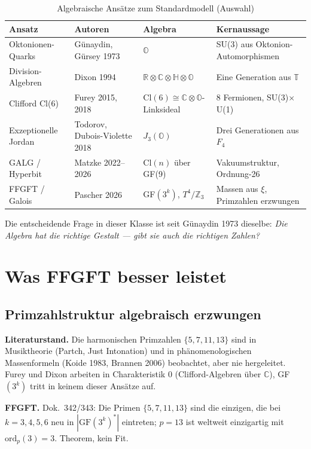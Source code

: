 \begin{table}[H]
\centering
\caption{Algebraische Ansätze zum Standardmodell (Auswahl)}
\begin{tabular}{llll}
\toprule
Ansatz & Autoren & Algebra & Kernaussage \\
\midrule
Oktonionen-Quarks & Günaydin, Gürsey 1973 & $\mathbb{O}$ & SU(3) aus Oktonion-Automorphismen \\
Division-Algebren & Dixon 1994 & $\mathbb{R}\otimes\mathbb{C}\otimes\mathbb{H}\otimes\mathbb{O}$ & Eine Generation aus $\mathbb{T}$ \\
Clifford Cl(6) & Furey 2015, 2018 & Cl$(6)\cong\mathbb{C}\otimes\mathbb{O}$-Linksideal & 8 Fermionen, SU(3)$\times$U(1) \\
Exzeptionelle Jordan & Todorov, Dubois-Violette 2018 & $J_3(\mathbb{O})$ & Drei Generationen aus $F_4$ \\
GALG / Hyperbit & Matzke 2022--2026 & Cl$(n)$ über GF(9) & Vakuumstruktur, Ordnung-26 \\
FFGFT / Galois & Pascher 2026 & GF$(3^k)$, $T^4/\mathbb{Z}_3$ & Massen aus $\xi$, Primzahlen erzwungen \\
\bottomrule
\end{tabular}
\end{table}

Die entscheidende Frage in dieser Klasse ist seit Günaydin 1973 dieselbe:
\emph{Die Algebra hat die richtige Gestalt --- gibt sie auch die richtigen Zahlen?}

\section{Was FFGFT besser leistet}

\subsection{Primzahlstruktur algebraisch erzwungen \BM}

\textbf{Literaturstand.} Die harmonischen Primzahlen $\{5,7,11,13\}$ sind
in Musiktheorie (Partch, Just Intonation) und in phänomenologischen
Massenformeln (Koide 1983, Brannen 2006) beobachtet, aber nie hergeleitet.
Furey und Dixon arbeiten in Charakteristik 0 (Clifford-Algebren über $\mathbb{C}$),
GF$(3^k)$ tritt in keinem dieser Ansätze auf.

\textbf{FFGFT.} Dok.~342/343: Die Primen $\{5,7,11,13\}$ sind die einzigen,
die bei $k=3,4,5,6$ neu in $|\mathrm{GF}(3^k)^*|$ eintreten; $p=13$ ist
weltweit einzigartig mit $\mathrm{ord}_p(3)=3$. Theorem, kein Fit.

